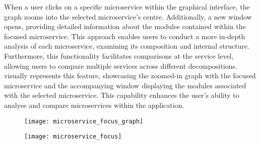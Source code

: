 When a user clicks on a specific microservice within the graphical interface,
the graph zooms into the selected microservice's centre. Additionally, a new
window opens, providing detailed information about the modules contained within
the focused microservice. This approach enables users to conduct a more
in-depth analysis of each microservice, examining its composition and internal
structure. Furthermore, this functionality facilitates comparisons at the
service level, allowing users to compare multiple services across different
decompositions.  visually represents this feature,
showcasing the zoomed-in graph with the focused microservice and the
accompanying window displaying the modules associated with the selected
microservice. This capability enhances the user's ability to analyse and
compare microservices within the application.

\begin{figure*}[!htb]
  \caption{Microservice Focus} \label{fig:microservice_focus}
  \centering
  \begin{subfigure}[!htb]{0.49\textwidth}
    \centering
    \texttt{[image: microservice\_focus\_graph]}
  \end{subfigure}
  \hfill
  \begin{subfigure}[!htb]{0.49\textwidth}
    \centering
    \texttt{[image: microservice\_focus]}
  \end{subfigure}
\end{figure*}
